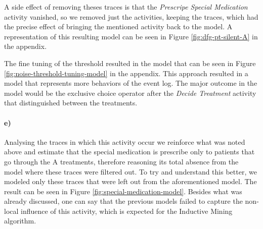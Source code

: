 \documentclass[12pt]{report}
\begin{document}
A side effect of removing theses traces is that the \emph{Prescripe Special Medication} activity vanished, so we removed just the activities, keeping the traces, which had the precise effect of bringing the mentioned activity back to the model. A representation of this resulting model can be seen in Figure \ref{fig:dfg-pt-silent-A} in the appendix.


The fine tuning of the threshold resulted in the model that can be seen in Figure \ref{fig:noise-threshold-tuning-model} in the appendix. This approach resulted in a model that represents more behaviors of the event log. The major outcome in the model would be the exclusive choice operator after the \emph{Decide Treatment} activity that distinguished between the treatments.


\paragraph{e)} 

Analysing the traces in which this activity occur we reinforce what was noted above and estimate that the special medication is prescribe only to patients that go through the A treatments, therefore reasoning its total absence from the model where these traces were filtered out. To try and understand this better, we modeled only these traces that were left out from the aforementioned model. The result can be seen in Figure \ref{fig:special-medication-model}. Besides what was already discussed, one can say that the previous models failed to capture the non-local influence of this activity, which is expected for the Inductive Mining algorithm.
\end{document}
